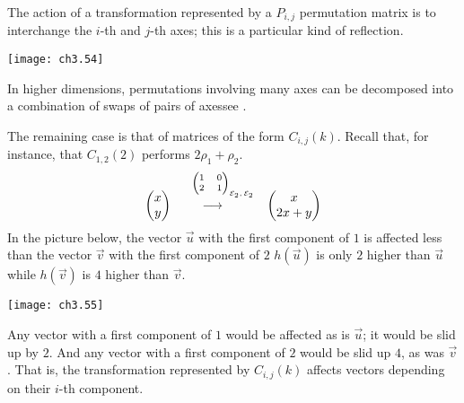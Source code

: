 The action of a transformation represented by a $P_{i,j}$ permutation matrix
is to interchange the $i$-th and $j$-th axes; this is a particular kind of
reflection. 
\begin{center}
  \texttt{[image: ch3.54]}
\end{center}
In higher dimensions, 
permutations involving many axes can be decomposed into a combination 
of swaps of pairs of axes\Dash see .

The remaining  case is that of matrices of the form $C_{i,j}(k)$.
Recall that, for instance, that $C_{1,2}(2)$ performs $2\rho_1+\rho_2$. 
\begin{equation*}
  \colvec{x  \\  y}
  \quad\begin{array}[b]{c}
      \text{\scriptsize $\begin{pmatrix}
                1  &0  \\
                2  &1  
          \end{pmatrix}_{\text{\makebox[0pt][l]{$\stdbasis_2,\stdbasis_2$}}}$ } \\[1.5ex]
          \longrightarrow
        \end{array}
   \qquad
   \colvec{x \\ 2x+y}
\end{equation*}
In the picture below, 
the vector $\vec{u}$ with the first component of $1$ is affected less 
than the vector $\vec{v}$ with the first component of $2$\Dash 
$h(\vec{u})$ is only $2$ higher than $\vec{u}$ while 
$h(\vec{v})$ is $4$ higher than $\vec{v}$.
\begin{center}
  \texttt{[image: ch3.55]}
\end{center}
Any vector with a first component of $1$ would be affected as is $\vec{u}$;
it would be slid up by $2$.
And any vector with a first component of $2$ would be slid up $4$, 
as was $\vec{v}$.
That is, the transformation represented by 
$C_{i,j}(k)$ affects vectors depending on their $i$-th component.

